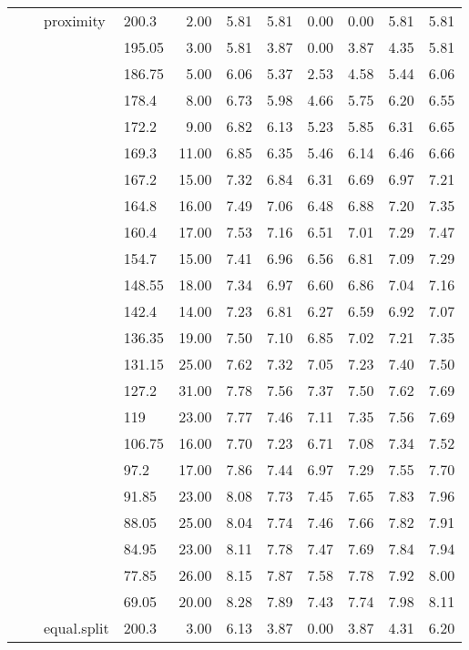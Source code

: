 \begin{longtable}{llllrrrrrrr}
   &  & proximity & 200.3 & 2.00 & 5.81 & 5.81 & 0.00 & 0.00 & 5.81 & 5.81 \\ 
   &  &  & 195.05 & 3.00 & 5.81 & 3.87 & 0.00 & 3.87 & 4.35 & 5.81 \\ 
   &  &  & 186.75 & 5.00 & 6.06 & 5.37 & 2.53 & 4.58 & 5.44 & 6.06 \\ 
   &  &  & 178.4 & 8.00 & 6.73 & 5.98 & 4.66 & 5.75 & 6.20 & 6.55 \\ 
   &  &  & 172.2 & 9.00 & 6.82 & 6.13 & 5.23 & 5.85 & 6.31 & 6.65 \\ 
   &  &  & 169.3 & 11.00 & 6.85 & 6.35 & 5.46 & 6.14 & 6.46 & 6.66 \\ 
   &  &  & 167.2 & 15.00 & 7.32 & 6.84 & 6.31 & 6.69 & 6.97 & 7.21 \\ 
   &  &  & 164.8 & 16.00 & 7.49 & 7.06 & 6.48 & 6.88 & 7.20 & 7.35 \\ 
   &  &  & 160.4 & 17.00 & 7.53 & 7.16 & 6.51 & 7.01 & 7.29 & 7.47 \\ 
   &  &  & 154.7 & 15.00 & 7.41 & 6.96 & 6.56 & 6.81 & 7.09 & 7.29 \\ 
   &  &  & 148.55 & 18.00 & 7.34 & 6.97 & 6.60 & 6.86 & 7.04 & 7.16 \\ 
   &  &  & 142.4 & 14.00 & 7.23 & 6.81 & 6.27 & 6.59 & 6.92 & 7.07 \\ 
   &  &  & 136.35 & 19.00 & 7.50 & 7.10 & 6.85 & 7.02 & 7.21 & 7.35 \\ 
   &  &  & 131.15 & 25.00 & 7.62 & 7.32 & 7.05 & 7.23 & 7.40 & 7.50 \\ 
   &  &  & 127.2 & 31.00 & 7.78 & 7.56 & 7.37 & 7.50 & 7.62 & 7.69 \\ 
   &  &  & 119 & 23.00 & 7.77 & 7.46 & 7.11 & 7.35 & 7.56 & 7.69 \\ 
   &  &  & 106.75 & 16.00 & 7.70 & 7.23 & 6.71 & 7.08 & 7.34 & 7.52 \\ 
   &  &  & 97.2 & 17.00 & 7.86 & 7.44 & 6.97 & 7.29 & 7.55 & 7.70 \\ 
   &  &  & 91.85 & 23.00 & 8.08 & 7.73 & 7.45 & 7.65 & 7.83 & 7.96 \\ 
   &  &  & 88.05 & 25.00 & 8.04 & 7.74 & 7.46 & 7.66 & 7.82 & 7.91 \\ 
   &  &  & 84.95 & 23.00 & 8.11 & 7.78 & 7.47 & 7.69 & 7.84 & 7.94 \\ 
   &  &  & 77.85 & 26.00 & 8.15 & 7.87 & 7.58 & 7.78 & 7.92 & 8.00 \\ 
   &  &  & 69.05 & 20.00 & 8.28 & 7.89 & 7.43 & 7.74 & 7.98 & 8.11 \\ 
   &  & equal.split & 200.3 & 3.00 & 6.13 & 3.87 & 0.00 & 3.87 & 4.31 & 6.20 \\ 

\end{longtable}
